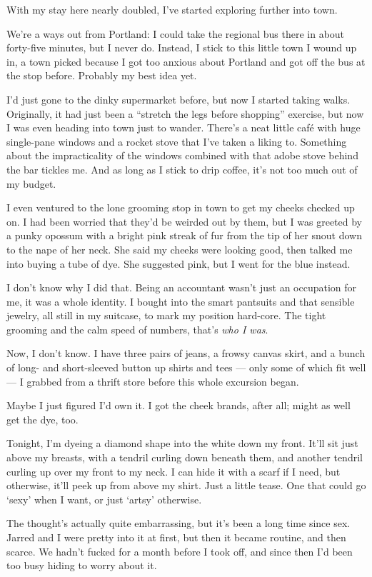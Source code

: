 With my stay here nearly doubled, I've started exploring further into town.

We're a ways out from Portland: I could take the regional bus there in about forty-five minutes, but I never do. Instead, I stick to this little town I wound up in, a town picked because I got too anxious about Portland and got off the bus at the stop before. Probably my best idea yet.

I'd just gone to the dinky supermarket before, but now I started taking walks. Originally, it had just been a ``stretch the legs before shopping'' exercise, but now I was even heading into town just to wander. There's a neat little café with huge single-pane windows and a rocket stove that I've taken a liking to. Something about the impracticality of the windows combined with that adobe stove behind the bar tickles me. And as long as I stick to drip coffee, it's not too much out of my budget.

I even ventured to the lone grooming stop in town to get my cheeks checked up on. I had been worried that they'd be weirded out by them, but I was greeted by a punky opossum with a bright pink streak of fur from the tip of her snout down to the nape of her neck. She said my cheeks were looking good, then talked me into buying a tube of dye. She suggested pink, but I went for the blue instead.

I don't know why I did that. Being an accountant wasn't just an occupation for me, it was a whole identity. I bought into the smart pantsuits and that sensible jewelry, all still in my suitcase, to mark my position hard-core. The tight grooming and the calm speed of numbers, that's \emph{who I was}.

Now, I don't know. I have three pairs of jeans, a frowsy canvas skirt, and a bunch of long- and short-sleeved button up shirts and tees --- only some of which fit well --- I grabbed from a thrift store before this whole excursion began.

Maybe I just figured I'd own it. I got the cheek brands, after all; might as well get the dye, too.

Tonight, I'm dyeing a diamond shape into the white down my front. It'll sit just above my breasts, with a tendril curling down beneath them, and another tendril curling up over my front to my neck. I can hide it with a scarf if I need, but otherwise, it'll peek up from above my shirt. Just a little tease. One that could go `sexy' when I want, or just `artsy' otherwise.

The thought's actually quite embarrassing, but it's been a long time since sex. Jarred and I were pretty into it at first, but then it became routine, and then scarce. We hadn't fucked for a month before I took off, and since then I'd been too busy hiding to worry about it.

